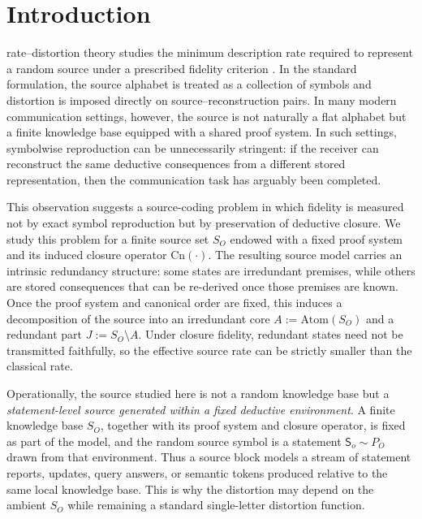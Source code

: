 \documentclass[journal,onecolumn]{IEEEtran}
\newcommand{\Atom}{\text{Atom}}
\newcommand{\Cn}{\text{Cn}}
\numberwithin{equation}{section}
\begin{document}
\section{Introduction}
\label{sec:introduction}

 rate--distortion theory studies the minimum description rate required to represent a random source under a prescribed fidelity criterion \cite{shannon1948mathematical,cover2006elements,csiszar2011information}. In the standard formulation, the source alphabet is treated as a collection of symbols and distortion is imposed directly on source--reconstruction pairs. In many modern communication settings, however, the source is not naturally a flat alphabet but a finite knowledge base equipped with a shared proof system. In such settings, symbolwise reproduction can be unnecessarily stringent: if the receiver can reconstruct the same deductive consequences from a different stored representation, then the communication task has arguably been completed.

This observation suggests a source-coding problem in which fidelity is measured not by exact symbol reproduction but by preservation of deductive closure. We study this problem for a finite source set \(S_O\) endowed with a fixed proof system and its induced closure operator \(\Cn(\cdot)\). The resulting source model carries an intrinsic redundancy structure: some states are irredundant premises, while others are stored consequences that can be re-derived once those premises are known. Once the proof system and canonical order are fixed, this induces a
decomposition of the source into an irredundant core
\(A:=\Atom(S_O)\) and a redundant part \(J:=S_O\setminus A\). Under closure fidelity, redundant states need not be transmitted faithfully, so the effective source rate can be strictly smaller than the classical rate.

Operationally, the source studied here is not a random knowledge base
but a \emph{statement-level source generated within a fixed deductive
environment}. A finite knowledge base \(S_O\), together with its proof
system and closure operator, is fixed as part of the model, and the
random source symbol is a statement \({\mathsf{S}}_o\sim P_O\) drawn from that
environment. Thus a source block models a stream of statement reports,
updates, query answers, or semantic tokens produced relative to the
same local knowledge base. This is why the distortion may depend on
the ambient \(S_O\) while remaining a standard single-letter
distortion function.
\end{document}
